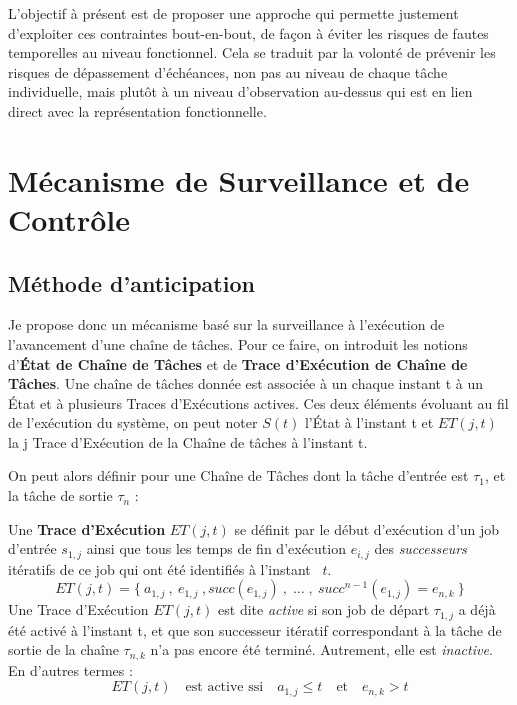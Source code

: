 \documentclass[french, a4paper, 11pt, twoside, pdftex]{StyleThese}
\begin{document}
	\smallbreak 
	
	L'objectif à présent est de proposer une approche qui permette justement d'exploiter ces contraintes bout-en-bout, de façon à éviter les risques de fautes temporelles au niveau fonctionnel. Cela se traduit par la volonté de prévenir les risques de dépassement d'échéances, non pas au niveau de chaque tâche individuelle, mais plutôt à un niveau d'observation au-dessus qui est en lien direct avec la représentation fonctionnelle.
	
    
\section{Mécanisme de Surveillance et de Contrôle}%
    \subsection{Méthode d'anticipation}
    
    Je propose donc un mécanisme basé sur la surveillance à l'exécution de l'avancement d'une chaîne de tâches. 
    Pour ce faire, on introduit les notions d'\textbf{État de Chaîne de Tâches} et de \textbf{Trace d'Exécution de Chaîne de Tâches}. Une chaîne de tâches donnée est associée à un chaque instant t à un État et à plusieurs Traces d'Exécutions actives. Ces deux éléments évoluant au fil de l'exécution du système, on peut noter $S(t)$ l'État à l'instant t et $ET(j,t)$ la j Trace d'Exécution de la Chaîne de tâches à l'instant t.
    
    On peut alors définir pour une Chaîne de Tâches dont la tâche d'entrée est $\tau_{1}$, et la tâche de sortie $\tau_{n}$ : 
    \begin{definition} \label{def:TraceExecutionChaine}
    	Une \textbf{Trace d'Exécution} $ET(j,t)$ se définit par le début d'exécution d'un job d'entrée $s_{1,j}$ ainsi que tous les temps de fin d'exécution $e_{i,j}$ des \textit{successeurs} itératifs de ce job qui ont été identifiés à l'instant ~$t$.
    	\begin{equation*}
    		ET(j,t) = \{\: a_{1,j} \:,\: e_{1,j} \:, succ(e_{1,j})\:, \;\dots\; ,\: succ^{n-1}(e_{1,j}) = e_{n,k} \:\}
    	\end{equation*}    	
    	Une Trace d'Exécution $ET(j,t)$ est dite \emph{active} si son job de départ $\tau_{1,j}$ a déjà été activé à l'instant t, et que son successeur itératif correspondant à la tâche de sortie de la chaîne $\tau_{n,k}$ n'a pas encore été terminé. Autrement, elle est \textit{inactive}. En d'autres termes :
    	\begin{equation*}
    		ET(j,t)  \quad \textrm{est active ssi}\quad  a_{1,j} \leq t \quad \textrm{et} \quad e_{n,k} > t
    	\end{equation*}
    \end{definition}
        
\end{document}
